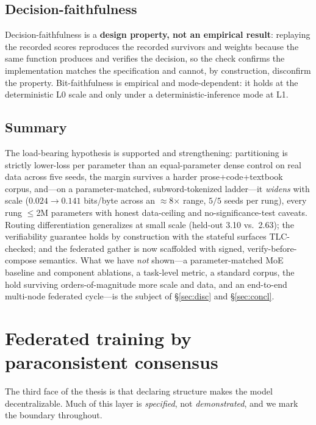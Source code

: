 \documentclass[11pt]{article}
\begin{document}
\subsection{Decision-faithfulness}
Decision-faithfulness is a \textbf{design property, not an empirical result}: replaying the recorded
scores reproduces the recorded survivors and weights because the same function produces and verifies
the decision, so the check confirms the implementation matches the specification and cannot, by
construction, disconfirm the property. Bit-faithfulness is empirical and mode-dependent: it holds at
the deterministic L0 scale and only under a deterministic-inference mode at L1.

\subsection{Summary}
The load-bearing hypothesis is supported and strengthening: partitioning is strictly lower-loss per
parameter than an equal-parameter dense control on real data across five seeds, the margin survives a
harder prose+code+textbook corpus, and---on a parameter-matched, subword-tokenized ladder---it
\emph{widens} with scale ($0.024\to0.141$ bits/byte across an $\approx$8$\times$ range, $5/5$ seeds per
rung), every rung $\le$2M parameters with honest data-ceiling and no-significance-test caveats.
Routing differentiation generalizes at small scale (held-out 3.10 vs.\ 2.63); the verifiability
guarantee holds by construction with the stateful surfaces TLC-checked; and the federated gather is
now scaffolded with signed, verify-before-compose semantics. What we have \emph{not} shown---a
parameter-matched MoE baseline and component ablations, a task-level metric, a standard corpus, the
hold surviving orders-of-magnitude more scale and data, and an end-to-end multi-node federated
cycle---is the subject of \S\ref{sec:disc} and \S\ref{sec:concl}.

\section{Federated training by paraconsistent consensus}\label{sec:fed}

The third face of the thesis is that declaring structure makes the model decentralizable. Much of this
layer is \emph{specified}, not \emph{demonstrated}, and we mark the boundary throughout.
\end{document}
